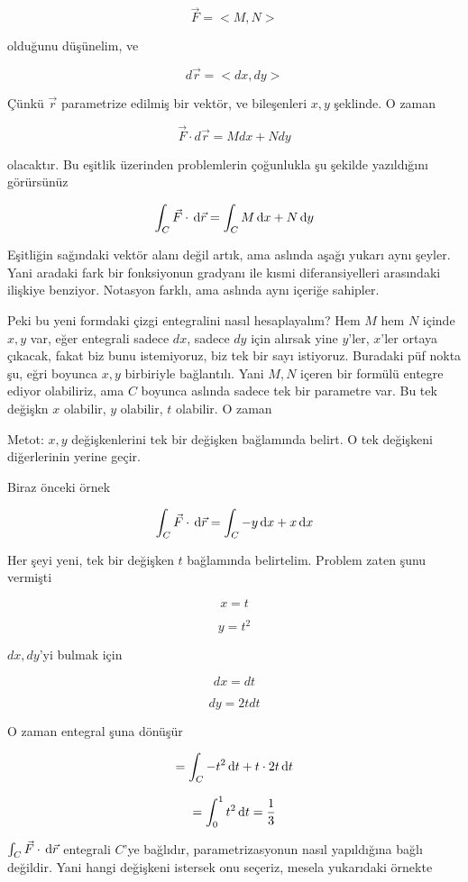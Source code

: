 \documentclass[12pt,fleqn]{article}\usepackage{../../common}
\begin{document}
$$ \vec{F} = <M,N> $$

olduğunu düşünelim, ve

$$ d\vec{r} = <dx, dy> $$

Çünkü $\vec{r}$ parametrize edilmiş bir vektör, ve bileşenleri $x,y$
şeklinde. O zaman

$$  \vec{F} \cdot d\vec{r}  = M dx + N dy
$$

olacaktır. Bu eşitlik üzerinden problemlerin çoğunlukla şu şekilde
yazıldığını görürsünüz

$$  \int_C \vec{F} \cdot \,\mathrm{d}\vec{r}  = \int_C M \,\mathrm{d} x + N \,\mathrm{d} y $$

Eşitliğin sağındaki vektör alanı değil artık, ama aslında aşağı yukarı aynı
şeyler. Yani aradaki fark bir fonksiyonun gradyanı ile kısmi diferansiyelleri
arasındaki ilişkiye benziyor. Notasyon farklı, ama aslında aynı içeriğe
sahipler.

Peki bu yeni formdaki çizgi entegralini nasıl hesaplayalım? Hem $M$ hem $N$
içinde $x,y$ var, eğer entegrali sadece $dx$, sadece $dy$ için alırsak yine
$y$'ler, $x$'ler ortaya çıkacak, fakat biz bunu istemiyoruz, biz tek bir
sayı istiyoruz. Buradaki püf nokta şu, eğri boyunca $x,y$ birbiriyle
bağlantılı. Yani $M,N$ içeren bir formülü entegre ediyor olabiliriz, ama
$C$ boyunca aslında sadece tek bir parametre var. Bu tek değişkn $x$
olabilir, $y$ olabilir, $t$ olabilir. O zaman 

Metot: $x,y$ değişkenlerini tek bir değişken bağlamında belirt. O tek değişkeni
diğerlerinin yerine geçir. 

Biraz önceki örnek

$$
\int_C \vec{F} \cdot \,\mathrm{d}\vec{r} 
= \int_C -y \,\mathrm{d} x + x \,\mathrm{d} x
$$

Her şeyi yeni, tek bir değişken $t$ bağlamında belirtelim. Problem zaten
şunu vermişti

$$ x = t  $$

$$ y = t^2 $$

$dx,dy$'yi bulmak için

$$ dx = dt $$

$$ dy = 2tdt $$

O zaman entegral şuna dönüşür

$$ = \int_C -t^2 \,\mathrm{d} t + t \cdot 2t \,\mathrm{d} t$$

$$ = \int_0^1 t^2 \,\mathrm{d} t = \frac{1}{3}$$

$\int_C \vec{F} \cdot \,\mathrm{d} \vec{r}$ entegrali $C$'ye bağlıdır, parametrizasyonun
nasıl yapıldığına bağlı değildir. Yani hangi değişkeni istersek onu seçeriz,
mesela yukarıdaki örnekte
\end{document}
